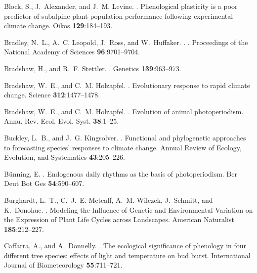 \documentclass{article}
\begin{document}
\begin{thebibliography}{131}
Block, S., J.~Alexander, and J.~M. Levine.
.
\newblock Phenological plasticity is a poor predictor of subalpine plant
  population performance following experimental climate change.
\newblock Oikos {\bf 129}:184--193.

Bradley, N.~L., A.~C. Leopold, J.~Ross, and W.~Huffaker.
.
.
\newblock Proceedings of the National Academy of Sciences {\bf 96}:9701--9704.

Bradshaw, H., and R.~F. Stettler.
.
\newblock Genetics {\bf 139}:963--973.

Bradshaw, W.~E., and C.~M. Holzapfel.
.
\newblock Evolutionary response to rapid climate change.
\newblock Science {\bf 312}:1477--1478.

Bradshaw, W.~E., and C.~M. Holzapfel.
.
\newblock Evolution of animal photoperiodism.
\newblock Annu. Rev. Ecol. Evol. Syst. {\bf 38}:1--25.

Buckley, L.~B., and J.~G. Kingsolver.
.
\newblock Functional and phylogenetic approaches to forecasting species'
  responses to climate change.
\newblock Annual Review of Ecology, Evolution, and Systematics {\bf
  43}:205--226.

B{\"u}nning, E.
.
\newblock Endogenous daily rhythms as the basis of photoperiodism.
\newblock Ber Deut Bot Ges {\bf 54}:590--607.

Burghardt, L.~T., C.~J.~E. Metcalf, A.~M. Wilczek, J.~Schmitt, and K.~Donohue.
.
\newblock Modeling the Influence of Genetic and Environmental Variation on the
  Expression of Plant Life Cycles across Landscapes.
\newblock American Naturalist {\bf 185}:212--227.

Caffarra, A., and A.~Donnelly.
.
\newblock The ecological significance of phenology in four different tree
  species: effects of light and temperature on bud burst.
\newblock International Journal of Biometeorology {\bf 55}:711--721.


\end{thebibliography}
\end{document}
